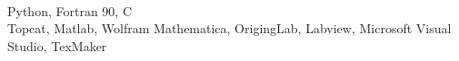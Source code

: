 \documentclass[10pt]{cv}
\begin{document}
\begin{llist}
\\
Python, Fortran 90, C
 \\
Topcat, Matlab, Wolfram Mathematica, OrigingLab, Labview, Microsoft Visual Studio, TexMaker




%
%
%
%

\end{llist}
\end{document}
